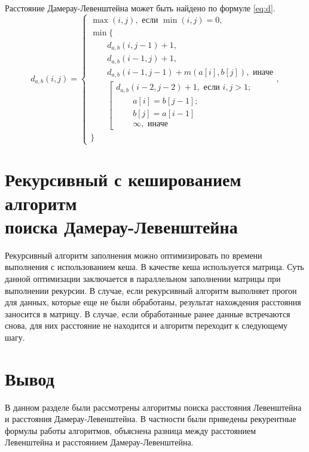 Расстояние Дамерау-Левенштейна может быть найдено по формуле \ref{eq:d}.
\begin{equation}
	\label{eq:d}
	d_{a,b}(i, j) = \begin{cases}
		\max(i, j), \text{ если }\min(i, j) = 0,\\
		\min \lbrace \\
			\qquad d_{a,b}(i, j-1) + 1,\\
			\qquad d_{a,b}(i-1, j) + 1,\\
			\qquad d_{a,b}(i-1, j-1) + m(a[i], b[j]), \text{ иначе}\\
			\qquad \left[ \begin{array}{cc}d_{a,b}(i-2, j-2) + 1, \text{ если }i,j > 1;\\
			\qquad \text{}a[i] = b[j-1]; \\
			\qquad \text{}b[j] = a[i-1]\\
			\qquad \infty,  \text{ иначе}\end{array}\right.\\
		\rbrace
		\end{cases},
\end{equation}

\section{Рекурсивный с кешированием алгоритм \\ поиска Дамерау-Левенштейна}

Рекурсивный алгоритм заполнения можно оптимизировать по времени выполнения с использованием кеша. В качестве кеша используется матрица. Суть данной оптимизации заключается в параллельном заполнении матрицы при выполнении рекурсии. 
В случае, если рекурсивный алгоритм выполняет прогон для данных, которые еще не были обработаны, результат нахождения расстояния заносится в матрицу. В случае, если обработанные ранее данные встречаются снова, для них расстояние не находится и алгоритм переходит к следующему шагу.


\section*{Вывод}

В данном разделе были рассмотрены алгоритмы поиска расстояния Левенштейна и расстояния Дамерау-Левенштейна. В частности были приведены рекурентные формулы работы алгоритмов, объяснена разница между расстоянием Левенштейна и расстоянием Дамерау-Левенштейна.

